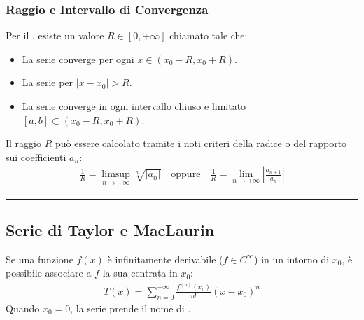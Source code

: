 \documentclass[letterpaper,10pt,italian]{jupyterBook}
\begin{document}
\subsubsection{Raggio e Intervallo di Convergenza}
\label{\detokenize{ch/series/series-functions-real:raggio-e-intervallo-di-convergenza}}
\sphinxAtStartPar
Per il , esiste un valore \(R \in [0, +\infty]\) chiamato  tale che:
\begin{itemize}
\item {} 
\sphinxAtStartPar
La serie converge  per ogni \(x \in (x_0 - R, x_0 + R)\).

\item {} 
\sphinxAtStartPar
La serie  per \(|x - x_0| > R\).

\item {} 
\sphinxAtStartPar
La serie converge  in ogni intervallo chiuso e limitato \([a, b] \subset (x_0 - R, x_0 + R)\).

\end{itemize}

\sphinxAtStartPar
Il raggio \(R\) può essere calcolato tramite i noti criteri della radice o del rapporto sui coefficienti \(a_n\):
\begin{equation*}
\begin{split}\frac{1}{R} = \limsup_{n \to +\infty} \sqrt[n]{|a_n|} \quad \text{oppure} \quad \frac{1}{R} = \lim_{n \to +\infty} \left| \frac{a_{n+1}}{a_n} \right|\end{split}
\end{equation*}

\bigskip\hrule\bigskip



\subsection{Serie di Taylor e MacLaurin}
\label{\detokenize{ch/series/series-functions-real:serie-di-taylor-e-maclaurin}}
\sphinxAtStartPar
Se una funzione \(f(x)\) è infinitamente derivabile (\(f \in C^\infty\)) in un intorno di \(x_0\), è possibile associare a \(f\) la sua  centrata in \(x_0\):
\begin{equation*}
\begin{split}T(x) = \sum_{n=0}^{+\infty} \frac{f^{(n)}(x_0)}{n!} (x - x_0)^n\end{split}
\end{equation*}
\sphinxAtStartPar
Quando \(x_0 = 0\), la serie prende il nome di .
\end{document}
